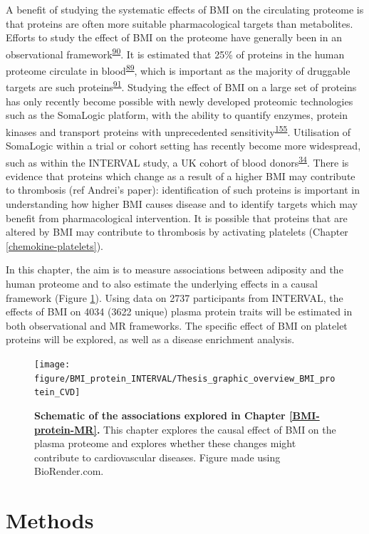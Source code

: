 \documentclass[11pt,twoside]{bristolthesis}
\begin{document}
A benefit of studying the systematic effects of BMI on the circulating proteome is that proteins are often more suitable pharmacological targets than metabolites. Efforts to study the effect of BMI on the proteome have generally been in an observational framework\textsuperscript{\protect\hyperlink{ref-Cominetti2018}{90}}. It is estimated that 25\% of proteins in the human proteome circulate in blood\textsuperscript{\protect\hyperlink{ref-Gold2012}{89}}, which is important as the majority of druggable targets are such proteins\textsuperscript{\protect\hyperlink{ref-Imming2006}{91}}. Studying the effect of BMI on a large set of proteins has only recently become possible with newly developed proteomic technologies such as the SomaLogic platform, with the ability to quantify enzymes, protein kinases and transport proteins with unprecedented sensitivity\textsuperscript{\protect\hyperlink{ref-Rohloff2014}{155}}. Utilisation of SomaLogic within a trial or cohort setting has recently become more widespread, such as within the INTERVAL study, a UK cohort of blood donors\textsuperscript{\protect\hyperlink{ref-Sun2018}{34}}. There is evidence that proteins which change as a result of a higher BMI may contribute to thrombosis (ref Andrei's paper): identification of such proteins is important in understanding how higher BMI causes disease and to identify targets which may benefit from pharmacological intervention. It is possible that proteins that are altered by BMI may contribute to thrombosis by activating platelets (Chapter \ref{chemokine-platelets}).

In this chapter, the aim is to measure associations between adiposity and the human proteome and to also estimate the underlying effects in a causal framework (Figure \ref{fig:BMI-protein-graphic-INT}). Using data on 2737 participants from INTERVAL, the effects of BMI on 4034 (3622 unique) plasma protein traits will be estimated in both observational and MR frameworks. The specific effect of BMI on platelet proteins will be explored, as well as a disease enrichment analysis.



\begin{figure}
\texttt{[image: figure/BMI\_protein\_INTERVAL/Thesis\_graphic\_overview\_BMI\_protein\_CVD]} \caption[Schematic of the associations explored in /\textsuperscript{\protect\hyperlink{ref-ref}{\textbf{ref?}}}(BMI-protein-MR).]{\textbf{Schematic of the associations explored in Chapter \ref{BMI-protein-MR}.} This chapter explores the causal effect of BMI on the plasma proteome and explores whether these changes might contribute to cardiovascular diseases. Figure made using BioRender.com.}\label{fig:BMI-protein-graphic-INT}
\end{figure}
\hypertarget{methods-2}{%
\section{Methods}\label{methods-2}}
\end{document}
